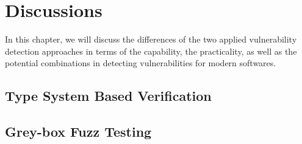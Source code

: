 
\chapter{Discussions} \label{ch:discuss}
In this chapter, we will discuss the differences of the two applied vulnerability detection approaches in terms of the capability, the practicality, as well as the potential combinations in detecting vulnerabilities for modern softwares.

\section{Type System Based Verification}

\section{Grey-box Fuzz Testing}
